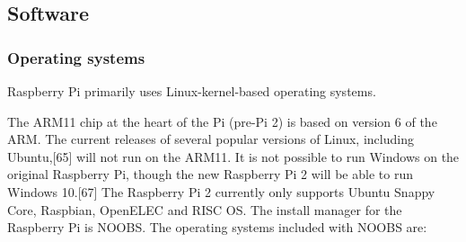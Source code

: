 \documentclass{acm_proc_article-sp}
\begin{document}
\subsection{Software}

\subsubsection{Operating systems}
Raspberry Pi primarily uses Linux-kernel-based operating systems.

The ARM11 chip at the heart of the Pi (pre-Pi 2) is based on version 6 of the ARM. The current releases of several popular versions of Linux, including Ubuntu,[65] will not run on the ARM11. It is not possible to run Windows on the original Raspberry Pi, though the new Raspberry Pi 2 will be able to run Windows 10.[67] The Raspberry Pi 2 currently only supports Ubuntu Snappy Core, Raspbian, OpenELEC and RISC OS.
\newline
\newline
The install manager for the Raspberry Pi is NOOBS. The operating systems included with NOOBS are:
\end{document}
